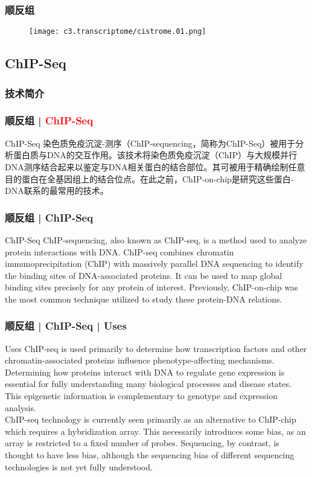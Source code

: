 \begin{frame}
  \frametitle{顺反组}
  \begin{figure}
    \centering
    \texttt{[image: c3.transcriptome/cistrome.01.png]}
  \end{figure}
\end{frame}

\subsection{ChIP-Seq}
\subsubsection{技术简介}
\begin{frame}
  \frametitle{顺反组 | \textcolor{red}{ChIP-Seq}}
  \begin{block}{ChIP-Seq}
染色质免疫沉淀-测序（ChIP-sequencing，简称为ChIP-Seq）被用于分析蛋白质与DNA的交互作用。该技术将染色质免疫沉淀（ChIP）与大规模并行DNA测序结合起来以鉴定与DNA相关蛋白的结合部位。其可被用于精确绘制任意目的蛋白在全基因组上的结合位点。在此之前，ChIP-on-chip是研究这些蛋白-DNA联系的最常用的技术。
  \end{block}
\end{frame}

\begin{frame}
  \frametitle{顺反组 | ChIP-Seq}
  \begin{block}{ChIP-Seq}
    ChIP-sequencing, also known as ChIP-seq, is a method used to analyze protein interactions with DNA. ChIP-seq combines chromatin immunoprecipitation (ChIP) with massively parallel DNA sequencing to identify the binding sites of DNA-associated proteins. It can be used to map global binding sites precisely for any protein of interest. Previously, ChIP-on-chip was the most common technique utilized to study these protein-DNA relations.
  \end{block}
\end{frame}

\begin{frame}
  \frametitle{顺反组 | ChIP-Seq | Uses}
  \begin{block}{Uses}
    ChIP-seq is used primarily to determine how transcription factors and other chromatin-associated proteins influence phenotype-affecting mechanisms. Determining how proteins interact with DNA to regulate gene expression is essential for fully understanding many biological processes and disease states. This epigenetic information is complementary to genotype and expression analysis.\\
    \vspace{1em}
    ChIP-seq technology is currently seen primarily as an alternative to ChIP-chip which requires a hybridization array. This necessarily introduces some bias, as an array is restricted to a fixed number of probes. Sequencing, by contrast, is thought to have less bias, although the sequencing bias of different sequencing technologies is not yet fully understood.\\
  \end{block}
\end{frame}

